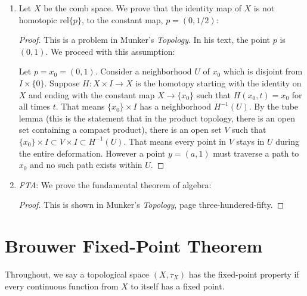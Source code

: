 \documentclass{book}
\begin{document}
\begin{enumerate}[(1)]
    \item Let $X$ be the comb space. We prove that the identity map of $X$ is not homotopic $\text{rel} \{p\}$, to the constant map, $p = (0,1/2)$: 
        \begin{proof} This is a problem in Munker's \textit{Topology}. In his text, the point $p$ is $(0,1)$. We proceed with this assumption: 
            \par Let $p = x_0=(0,1)$. Consider a neighborhood $U$ of $x_0$ which is disjoint from $I\times\{0\}$. Suppose $H:X\times I\to X$ is the homotopy starting with the identity on $X$ and ending with the constant map $X\to\{x_0\}$ such that $H(x_0,t)=x_0$ for all times $t$. That means $\{x_0\}\times I$ has a neighborhood $H^{-1}(U)$. By the tube lemma (this is the statement that in the product topology, there is an open set containing a compact product), there is an open set $V$ such that $\{x_0\}\times I\subset V\times I\subset H^{-1}(U)$. That means every point in $V$ stays in $U$ during the entire deformation. However a point $y=(a,1)$ must traverse a path to $x_0$ and no such path exists within $U$.
        \end{proof}

    \item \textit{FTA}: We prove the fundamental theorem of algebra: 
        \begin{proof} This is shown in Munker's \textit{Topology}, page three-hundered-fifty. 
        \end{proof}
\end{enumerate}

\section{Brouwer Fixed-Point Theorem}
\par Throughout, we say a topological space $(X, \tau_X)$ has the fixed-point property if every continuous function from $X$ to itself has a fixed point. 
\end{document}
